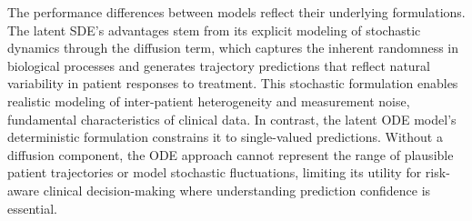 \documentclass[preprint,12pt]{elsarticle}
\begin{document}
The performance differences between models reflect their underlying formulations. The latent SDE's advantages stem from its explicit modeling of stochastic dynamics through the diffusion term, which captures the inherent randomness in biological processes and generates trajectory predictions that reflect natural variability in patient responses to treatment. This stochastic formulation enables realistic modeling of inter-patient heterogeneity and measurement noise, fundamental characteristics of clinical data. In contrast, the latent ODE model's deterministic formulation constrains it to single-valued predictions. Without a diffusion component, the ODE approach cannot represent the range of plausible patient trajectories or model stochastic fluctuations, limiting its utility for risk-aware clinical decision-making where understanding prediction confidence is essential.
\end{document}
